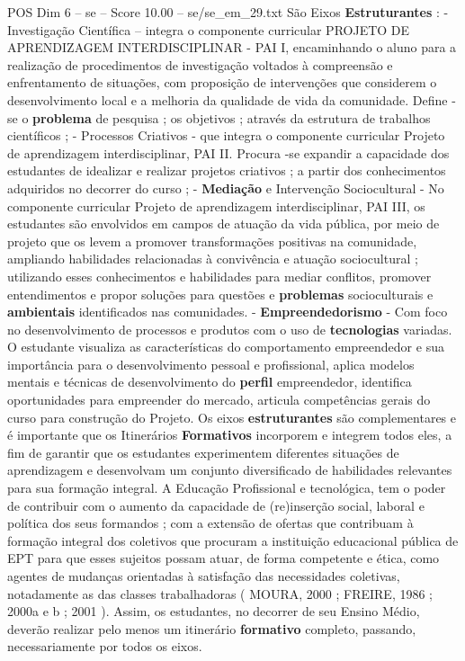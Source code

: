 \begin{textsample}{POS Dim 6 – se – Score 10.00 – se/se\_em\_29.txt}
São Eixos \textbf{Estruturantes} : - Investigação Científica – integra o componente curricular PROJETO DE APRENDIZAGEM INTERDISCIPLINAR - PAI I, encaminhando o aluno para a realização de procedimentos de investigação voltados à compreensão e enfrentamento de situações, com proposição de intervenções que considerem o desenvolvimento local e a melhoria da qualidade de vida da comunidade.
Define -se o \textbf{problema} de pesquisa ; os objetivos ; através da estrutura de trabalhos científicos ; - Processos Criativos - que integra o componente curricular Projeto de aprendizagem interdisciplinar, PAI II.
Procura -se expandir a capacidade dos estudantes de idealizar e realizar projetos criativos ; a partir dos conhecimentos adquiridos no decorrer do curso ; - \textbf{Mediação} e Intervenção Sociocultural - No componente curricular Projeto de aprendizagem interdisciplinar, PAI III, os estudantes são envolvidos em campos de atuação da vida pública, por meio de projeto que os levem a promover transformações positivas na comunidade, ampliando habilidades relacionadas à convivência e atuação sociocultural ; utilizando esses conhecimentos e habilidades para mediar conflitos, promover entendimentos e propor soluções para questões e \textbf{problemas} socioculturais e \textbf{ambientais} identificados nas comunidades. - \textbf{Empreendedorismo} - Com foco no desenvolvimento de processos e produtos com o uso de \textbf{tecnologias} variadas.
O estudante visualiza as características do comportamento empreendedor e sua importância para o desenvolvimento pessoal e profissional, aplica modelos mentais e técnicas de desenvolvimento do \textbf{perfil} empreendedor, identifica oportunidades para empreender do mercado, articula competências gerais do curso para construção do Projeto.
Os eixos \textbf{estruturantes} são complementares e é importante que os Itinerários \textbf{Formativos} incorporem e integrem todos eles, a fim de garantir que os estudantes experimentem diferentes situações de aprendizagem e desenvolvam um conjunto diversificado de habilidades relevantes para sua formação integral.
A Educação Profissional e tecnológica, tem o poder de contribuir com o aumento da capacidade de (re)inserção social, laboral e política dos seus formandos ; com a extensão de ofertas que contribuam à formação integral dos coletivos que procuram a instituição educacional pública de EPT para que esses sujeitos possam atuar, de forma competente e ética, como agentes de mudanças orientadas à satisfação das necessidades coletivas, notadamente as das classes trabalhadoras ( MOURA, 2000 ; FREIRE, 1986 ; 2000a e b ; 2001 ).
Assim, os estudantes, no decorrer de seu Ensino Médio, deverão realizar pelo menos um itinerário \textbf{formativo} completo, passando, necessariamente por todos os eixos.

\end{textsample}
